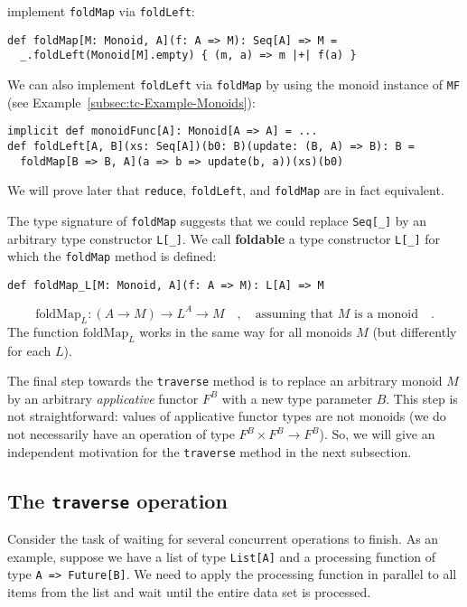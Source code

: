 implement \lstinline!foldMap! via \lstinline!foldLeft!:
\begin{lstlisting}
def foldMap[M: Monoid, A](f: A => M): Seq[A] => M =
  _.foldLeft(Monoid[M].empty) { (m, a) => m |+| f(a) }
\end{lstlisting}
We can also implement \lstinline!foldLeft! via \lstinline!foldMap!
by using the monoid instance of \lstinline!MF! (see Example~\ref{subsec:tc-Example-Monoids}):
\begin{lstlisting}
implicit def monoidFunc[A]: Monoid[A => A] = ...
def foldLeft[A, B](xs: Seq[A])(b0: B)(update: (B, A) => B): B =
  foldMap[B => B, A](a => b => update(b, a))(xs)(b0)
\end{lstlisting}
We will prove later that \lstinline!reduce!, \lstinline!foldLeft!,
and \lstinline!foldMap! are in fact equivalent.

The type signature of \lstinline!foldMap! suggests that we could
replace \lstinline!Seq[_]! by an arbitrary type constructor \lstinline!L[_]!.
We call \textbf{foldable} a type constructor
\lstinline!L[_]! for which the \lstinline!foldMap! method is defined:
\begin{lstlisting}
def foldMap_L[M: Monoid, A](f: A => M): L[A] => M
\end{lstlisting}
\[
\text{foldMap}_{L}:\left(A\rightarrow M\right)\rightarrow L^{A}\rightarrow M\quad,\quad\text{assuming that }M\text{ is a monoid}\quad.
\]
The function $\text{foldMap}_{L}$ works in the same way for all monoids
$M$ (but differently for each $L$). 

The final step towards the \lstinline!traverse! method is to replace
an arbitrary monoid $M$ by an arbitrary \emph{applicative} functor
$F^{B}$ with a new type parameter $B$. This step is not straightforward:
values of applicative functor types are not monoids (we do not necessarily
have an operation of type $F^{B}\times F^{B}\rightarrow F^{B}$).
So, we will give an independent motivation for the \lstinline!traverse!
method in the next subsection.

\subsection{The \texttt{traverse} operation\label{subsec:The-traverse-operation}}

Consider the task of waiting for several concurrent operations to
finish. As an example, suppose we have a list of type \lstinline!List[A]!
and a processing function of type \lstinline!A => Future[B]!. We
need to apply the processing function in parallel to all items from
the list and wait until the entire data set is processed.

